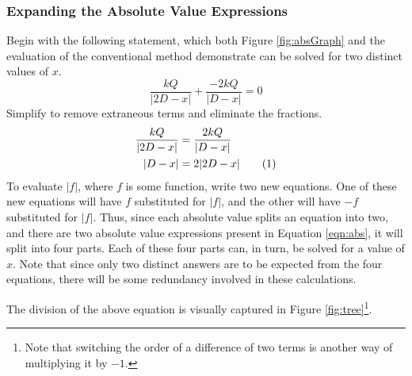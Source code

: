 \documentclass[titlepage]{article}
\begin{document}
\subsubsection*{Expanding the Absolute Value Expressions}
Begin with the following statement, which both Figure \ref{fig:absGraph} and the evaluation of the conventional method demonstrate can be solved for two distinct values of $x$.
\begin{equation*}
    \frac{kQ}{|2D-x|}+\frac{-2kQ}{|D-x|}=0
\end{equation*}
Simplify to remove extraneous terms and eliminate the fractions.
\begin{align*}
    \frac{kQ}{|2D-x|} &= \frac{2kQ}{|D-x|}\\
    |D-x| &= 2|2D-x|\stepcounter{equation}\tag{\theequation}\label{eqn:abs}
\end{align*}
To evaluate $|f|$, where $f$ is some function, write two new equations. One of these new equations will have $f$ substituted for $|f|$, and the other will have $-f$ substituted for $|f|$. Thus, since each absolute value splits an equation into two, and there are two absolute value expressions present in Equation \ref{eqn:abs}, it will split into four parts. Each of these four parts can, in turn, be solved for a value of $x$. Note that since only two distinct answers are to be expected from the four equations, there will be some redundancy involved in these calculations.\par
The division of the above equation is visually captured in Figure \ref{fig:tree}\footnote{Note that switching the order of a difference of two terms is another way of multiplying it by $-1$.}.
\end{document}

